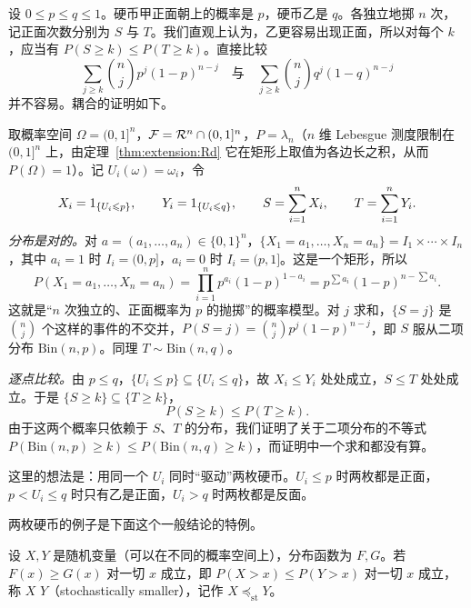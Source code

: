 \begin{example}[两枚硬币]\label{ex:distributions:two-coins}
设 $0\leqslant p\leqslant q\leqslant1$。硬币甲正面朝上的概率是 $p$，硬币乙是 $q$。各独立地掷 $n$ 次，记正面次数分别为 $S$ 与 $T$。我们直观上认为，乙更容易出现正面，所以对每个 $k$，应当有 $P(S\geqslant k)\leqslant P(T\geqslant k)$。直接比较
\[
\sum_{j\geqslant k}\binom njp^j(1-p)^{n-j}\quad\text{与}\quad\sum_{j\geqslant k}\binom njq^j(1-q)^{n-j}
\]
并不容易。耦合的证明如下。

取概率空间 $\Omega=(0,1]^n$，$\mathcal{F}=\mathcal{R}^n\cap(0,1]^n$，$P=\lambda_n$（$n$ 维 Lebesgue 测度限制在 $(0,1]^n$ 上，由定理~\ref{thm:extension:Rd} 它在矩形上取值为各边长之积，从而 $P(\Omega)=1$）。记 $U_i(\omega)=\omega_i$，令
\[
X_i=1_{\{U_i\leqslant p\}},\qquad Y_i=1_{\{U_i\leqslant q\}},\qquad S=\sum_{i=1}^nX_i,\qquad T=\sum_{i=1}^nY_i.
\]
\emph{分布是对的。}对 $a=(a_1,\dots,a_n)\in\{0,1\}^n$，$\{X_1=a_1,\dots,X_n=a_n\}=I_1\times\cdots\times I_n$，其中 $a_i=1$ 时 $I_i=(0,p]$，$a_i=0$ 时 $I_i=(p,1]$。这是一个矩形，所以
\[
P(X_1=a_1,\dots,X_n=a_n)=\prod_{i=1}^np^{a_i}(1-p)^{1-a_i}=p^{\sum a_i}(1-p)^{n-\sum a_i}.
\]
这就是“$n$ 次独立的、正面概率为 $p$ 的抛掷”的概率模型。对 $j$ 求和，$\{S=j\}$ 是 $\binom nj$ 个这样的事件的不交并，$P(S=j)=\binom njp^j(1-p)^{n-j}$，即 $S$ 服从二项分布 $\mathrm{Bin}(n,p)$。同理 $T\sim\mathrm{Bin}(n,q)$。

\emph{逐点比较。}由 $p\leqslant q$，$\{U_i\leqslant p\}\subseteq\{U_i\leqslant q\}$，故 $X_i\leqslant Y_i$ 处处成立，$S\leqslant T$ 处处成立。于是 $\{S\geqslant k\}\subseteq\{T\geqslant k\}$，
\[
P(S\geqslant k)\leqslant P(T\geqslant k).
\]
由于这两个概率只依赖于 $S$、$T$ 的分布，我们证明了关于二项分布的不等式 $P(\mathrm{Bin}(n,p)\geqslant k)\leqslant P(\mathrm{Bin}(n,q)\geqslant k)$，而证明中一个求和都没有算。

这里的想法是：用同一个 $U_i$ 同时“驱动”两枚硬币。$U_i\leqslant p$ 时两枚都是正面，$p<U_i\leqslant q$ 时只有乙是正面，$U_i>q$ 时两枚都是反面。
\end{example}

两枚硬币的例子是下面这个一般结论的特例。

\begin{definition}[随机序]\label{def:distributions:stochastic-order}
设 $X,Y$ 是随机变量（可以在不同的概率空间上），分布函数为 $F,G$。若 $F(x)\geqslant G(x)$ 对一切 $x$ 成立，即 $P(X>x)\leqslant P(Y>x)$ 对一切 $x$ 成立，称 $X$  $Y$（stochastically smaller），记作 $X\preceq_{\mathrm{st}}Y$。
\end{definition}

